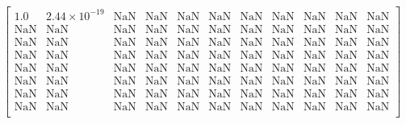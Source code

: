 \scriptsize
\begin{equation}\label{eq:no_upper_bound_states_example}
\begin{bmatrix}
    1.0 & 2.44\times10^{-19} & \text{NaN} & \text{NaN} & \text{NaN} & \text{NaN}
    & \text{NaN} & \text{NaN} & \text{NaN} & \text{NaN} & \text{NaN} \\
    \text{NaN} & \text{NaN} & \text{NaN} & \text{NaN} & \text{NaN} & \text{NaN}
    & \text{NaN} & \text{NaN} & \text{NaN} & \text{NaN} & \text{NaN} \\
    \text{NaN} & \text{NaN} & \text{NaN} & \text{NaN} & \text{NaN} & \text{NaN}
    & \text{NaN} & \text{NaN} & \text{NaN} & \text{NaN} & \text{NaN} \\
    \text{NaN} & \text{NaN} & \text{NaN} & \text{NaN} & \text{NaN} & \text{NaN}
    & \text{NaN} & \text{NaN} & \text{NaN} & \text{NaN} & \text{NaN} \\
    \text{NaN} & \text{NaN} & \text{NaN} & \text{NaN} & \text{NaN} & \text{NaN}
    & \text{NaN} & \text{NaN} & \text{NaN} & \text{NaN} & \text{NaN} \\
    \text{NaN} & \text{NaN} & \text{NaN} & \text{NaN} & \text{NaN} & \text{NaN}
    & \text{NaN} & \text{NaN} & \text{NaN} & \text{NaN} & \text{NaN} \\
    \text{NaN} & \text{NaN} & \text{NaN} & \text{NaN} & \text{NaN} & \text{NaN}
    & \text{NaN} & \text{NaN} & \text{NaN} & \text{NaN} & \text{NaN} \\
    \text{NaN} & \text{NaN} & \text{NaN} & \text{NaN} & \text{NaN} & \text{NaN}
    & \text{NaN} & \text{NaN} & \text{NaN} & \text{NaN} & \text{NaN} \\
\end{bmatrix}
\end{equation}

